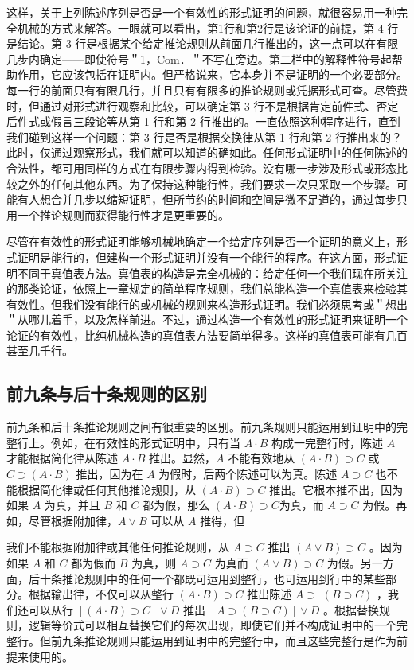 这样，关于上列陈述序列是否是一个有效性的形式证明的问题，就很容易用一种完全机械的方式来解答。一眼就可以看出，第1行和第2行是该论证的前提，第 4 行是结论。第 3 行是根据某个给定推论规则从前面几行推出的，这一点可以在有限几步内确定——即使符号＂1，Com．＂不写在旁边。第二栏中的解释性符号起帮助作用，它应该包括在证明内。但严格说来，它本身并不是证明的一个必要部分。每一行的前面只有有限几行，并且只有有限多的推论规则或凭据形式可查。尽管费时，但通过对形式进行观察和比较，可以确定第 3 行不是根据肯定前件式、否定后件式或假言三段论等从第 1 行和第 2 行推出的。一直依照这种程序进行，直到我们碰到这样一个问题：第 3 行是否是根据交换律从第 1 行和第 2 行推出来的？此时，仅通过观察形式，我们就可以知道的确如此。任何形式证明中的任何陈述的合法性，都可用同样的方式在有限步骤内得到检验。没有哪一步涉及形式或形态比较之外的任何其他东西。为了保持这种能行性，我们要求一次只采取一个步骤。可能有人想合并几步以缩短证明，但所节约的时间和空间是微不足道的，通过每步只用一个推论规则而获得能行性才是更重要的。

尽管在有效性的形式证明能够机械地确定一个给定序列是否一个证明的意义上，形式证明是能行的，但建构一个形式证明并没有一个能行的程序。在这方面，形式证明不同于真值表方法。真值表的构造是完全机械的：给定任何一个我们现在所关注的那类论证，依照上一章规定的简单程序规则，我们总能构造一个真值表来检验其有效性。但我们没有能行的或机械的规则来构造形式证明。我们必须思考或＂想出＂从哪儿着手，以及怎样前进。不过，通过构造一个有效性的形式证明来证明一个论证的有效性，比纯机械构造的真值表方法要简单得多。这样的真值表可能有几百甚至几千行。

\subsection{前九条与后十条规则的区别}

前九条和后十条推论规则之间有很重要的区别。前九条规则只能运用到证明中的完整行上。例如，在有效性的形式证明中，只有当 $A \cdot B$ 构成一完整行时，陈述 $A$ 才能根据简化律从陈述 $A \cdot B$ 推出。显然，$A$ 不能有效地从 $(A \cdot B) \supset C$ 或 $C \supset(A \cdot B)$ 推出，因为在 $A$ 为假时，后两个陈述可以为真。陈述 $A \supset C$ 也不能根据简化律或任何其他推论规则，从 $(A \cdot B) \supset C$ 推出。它根本推不出，因为如果 $A$ 为真，并且 $B$ 和 $C$ 都为假，那么 $(A \cdot B) \supset C$为真，而 $A \supset C$ 为假。再如，尽管根据附加律，$A \vee B$ 可以从 $A$ 推得，但

我们不能根据附加律或其他任何推论规则，从 $A \supset C$ 推出 $(A \vee B) \supset C$ 。因为如果 $A$ 和 $C$ 都为假而 $B$ 为真，则 $A \supset C$ 为真而 $(A \vee B) \supset C$ 为假。另一方面，后十条推论规则中的任何一个都既可运用到整行，也可运用到行中的某些部分。根据输出律，不仅可以从整行 $(A \cdot B) \supset C$ 推出陈述 $A \supset$ $(B \supset C)$ ，我们还可以从行 $[(A \cdot B) \supset C] \vee D$ 推出 $[A \supset(B \supset C)] \vee D$ 。根据替换规则，逻辑等价式可以相互替换它们的每次出现，即使它们并不构成证明中的一个完整行。但前九条推论规则只能运用到证明中的完整行中，而且这些完整行是作为前提来使用的。

